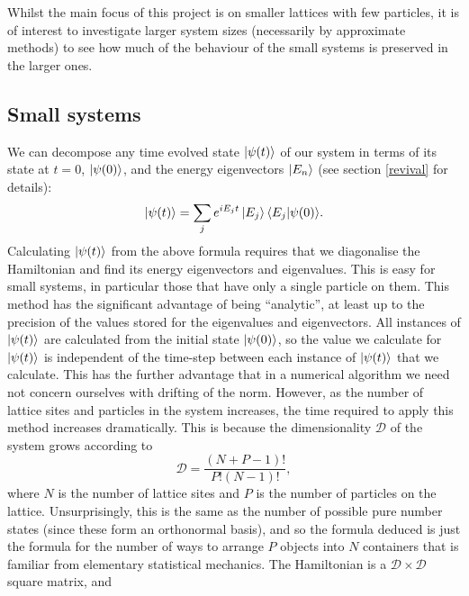 \documentclass[a4paper, 10pt, draft]{article}
\theoremstyle{plain}
\begin{document}
Whilst the main focus of this project is on smaller lattices with few
particles, it is of interest to investigate larger system sizes (necessarily
by approximate methods) to see how much of the behaviour of the small systems
is preserved in the larger ones.


\subsection{Small systems}

We can decompose any time evolved state $\ket{\psi(t)}$ of our system in terms
of its state at $t=0$, $\ket{\psi(0)}$, and the energy eigenvectors $\ket{E_n}$
(see section \ref{revival} for details):
\begin{equation}
    \ket{\psi(t)} = \sum_{j}{e^{i E_{j}t} \ket{E_{j}} \braket{E_{j}|\psi(0)}}.
\end{equation}
Calculating $\ket{\psi(t)}$ from the above formula requires that we diagonalise
the Hamiltonian and find its energy eigenvectors and eigenvalues. This is easy
for small systems, in particular those that have only a single particle on them.
This method has the significant advantage of being ``analytic'', at least up to
the precision of the values stored for the eigenvalues and eigenvectors. All
instances of $\ket{\psi(t)}$ are calculated from the initial state
$\ket{\psi(0)}$, so the value we calculate for $\ket{\psi(t)}$ is independent of the time-step
between each instance of $\ket{\psi(t)}$ that we calculate. This has the further
advantage that in a numerical algorithm we need not concern ourselves with
drifting of the norm. However, as the number of lattice
sites and particles in the system increases, the time required to apply this
method increases dramatically. This is because the dimensionality $\mathcal{D}$
of the system grows according to
\begin{equation}
    \label{dimensionality_exact}
    \mathcal{D} = \frac{(N + P - 1)!}{P! (N-1)!},
\end{equation}
where $N$ is the number of lattice sites and $P$ is the number of particles on
the lattice. Unsurprisingly, this is the same as the number of possible pure
number states (since these form an orthonormal basis), and so the formula
deduced is just the formula for the number of ways to arrange $P$ objects into
$N$ containers that is familiar from elementary statistical mechanics.
The Hamiltonian is a $\mathcal{D}\times\mathcal{D}$ square matrix, and
\end{document}
